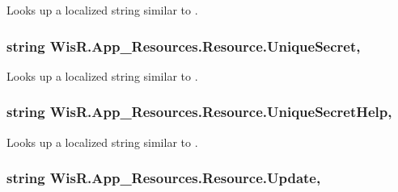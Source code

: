 Looks up a localized string similar to . 

\hypertarget{class_wis_r_1_1_app___resources_1_1_resource_a393a8cafe1ef1729c07819950f906bab}{}
\subsubsection[{Unique\+Secret}]{\setlength{\rightskip}{0pt plus 5cm}string Wis\+R.\+App\+\_\+\+Resources.\+Resource.\+Unique\+Secret\hspace{0.3cm}{\ttfamily [static]}, {\ttfamily [get]}}\label{class_wis_r_1_1_app___resources_1_1_resource_a393a8cafe1ef1729c07819950f906bab}


Looks up a localized string similar to . 

\hypertarget{class_wis_r_1_1_app___resources_1_1_resource_ac4ce447a1d6913ed38afb8d4b381638e}{}
\subsubsection[{Unique\+Secret\+Help}]{\setlength{\rightskip}{0pt plus 5cm}string Wis\+R.\+App\+\_\+\+Resources.\+Resource.\+Unique\+Secret\+Help\hspace{0.3cm}{\ttfamily [static]}, {\ttfamily [get]}}\label{class_wis_r_1_1_app___resources_1_1_resource_ac4ce447a1d6913ed38afb8d4b381638e}


Looks up a localized string similar to . 

\hypertarget{class_wis_r_1_1_app___resources_1_1_resource_ab20023c08ca1b673632d8b41a6c037bf}{}
\subsubsection[{Update}]{\setlength{\rightskip}{0pt plus 5cm}string Wis\+R.\+App\+\_\+\+Resources.\+Resource.\+Update\hspace{0.3cm}{\ttfamily [static]}, {\ttfamily [get]}}\label{class_wis_r_1_1_app___resources_1_1_resource_ab20023c08ca1b673632d8b41a6c037bf}


